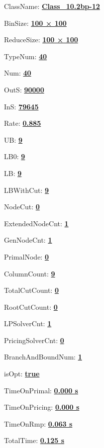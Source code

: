 \documentclass[11pt]{article}
\begin{document}
\pagestyle{empty}


ClassName: \underline{\textbf{Class_10.2bp-12}}
\par
BinSize: \underline{\textbf{100 × 100}}
\par
ReduceSize: \underline{\textbf{100 × 100}}
\par
TypeNum: \underline{\textbf{40}}
\par
Num: \underline{\textbf{40}}
\par
OutS: \underline{\textbf{90000}}
\par
InS: \underline{\textbf{79645}}
\par
Rate: \underline{\textbf{0.885}}
\par
UB: \underline{\textbf{9}}
\par
LB0: \underline{\textbf{9}}
\par
LB: \underline{\textbf{9}}
\par
LBWithCut: \underline{\textbf{9}}
\par
NodeCut: \underline{\textbf{0}}
\par
ExtendedNodeCnt: \underline{\textbf{1}}
\par
GenNodeCnt: \underline{\textbf{1}}
\par
PrimalNode: \underline{\textbf{0}}
\par
ColumnCount: \underline{\textbf{9}}
\par
TotalCutCount: \underline{\textbf{0}}
\par
RootCutCount: \underline{\textbf{0}}
\par
LPSolverCnt: \underline{\textbf{1}}
\par
PricingSolverCnt: \underline{\textbf{0}}
\par
BranchAndBoundNum: \underline{\textbf{1}}
\par
isOpt: \underline{\textbf{true}}
\par
TimeOnPrimal: \underline{\textbf{0.000 s}}
\par
TimeOnPricing: \underline{\textbf{0.000 s}}
\par
TimeOnRmp: \underline{\textbf{0.063 s}}
\par
TotalTime: \underline{\textbf{0.125 s}}
\par
\newpage


\end{document}
